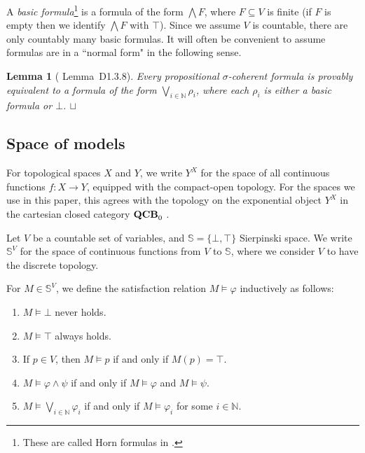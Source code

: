 \documentclass{article}
\theoremstyle{plain}
\newtheorem{lemma}[Theorem]{Lemma}
\def\squareforqed{\hbox{\rlap{$\sqcap$}$\sqcup$}}
\def\qed{\ifmmode\squareforqed\else{\unskip\nobreak\hfil
\penalty50\hskip1em\null\nobreak\hfil\squareforqed
\parfillskip=0pt\finalhyphendemerits=0\endgraf}\fi}
\def\QCB{{{\bf QCB}_0}}
\def\IN{{\mathbb N}}
\def\sierp{{\mathbb S}}
\def\QCB{{{\bf QCB}_0}}
\begin{document}
A \emph{basic formula}\footnote{These are called Horn formulas in \cite{J02}.} is a formula of the form $\bigwedge F$, where $F\subseteq V$ is finite (if $F$ is empty then we identify $\bigwedge F$ with $\top$). Since we assume $V$ is countable, there are only countably many basic formulas. It will often be convenient to assume formulas are in a ``normal form" in the following sense.

\begin{lemma}[\cite{J02} Lemma~D1.3.8]\label{lem:normalform}
Every propositional $\sigma$-coherent formula is provably equivalent to a formula of the form $\bigvee_{i\in\IN}\rho_i$, where each $\rho_i$ is either a basic formula or $\bot$.
\qed
\end{lemma}





\subsection{Space of models}

For topological spaces $X$ and $Y$, we write $Y^X$ for the space of all continuous functions $f\colon X\to Y$, equipped with the compact-open topology. For the spaces we use in this paper, this agrees with the topology on the exponential object $Y^X$ in the cartesian closed category $\QCB$ \cite{BSS07}.

Let $V$ be a countable set of variables, and $\sierp=\{\bot,\top\}$ Sierpinski space. We write $\sierp^V$ for the space of continuous functions from $V$ to $\sierp$, where we consider $V$ to have the discrete topology.



For $M\in \sierp^V$, we define the satisfaction relation $M\vDash \varphi$ inductively as follows:
\begin{enumerate}
\item
$M\vDash \bot$ never holds.
\item
$M\vDash \top$ always holds.
\item
If $p\in V$, then $M\vDash p$ if and only if $M(p)=\top$.
\item
$M\vDash \varphi\wedge \psi$ if and only if $M\vDash \varphi$ and $M\vDash \psi$.
\item
$M\vDash \bigvee_{i\in \IN} \varphi_i$ if and only if $M \vDash \varphi_i$ for some $i\in \IN$.
\end{enumerate}
\end{document}
